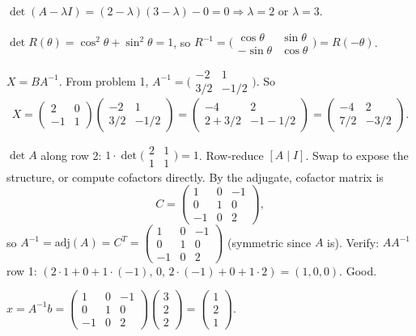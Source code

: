 \begin{solutions}
    \item $\det(A - \lambda I) = (2 - \lambda)(3 - \lambda) - 0 = 0 \Rightarrow \lambda = 2$ or $\lambda = 3$.
    \item $\det R(\theta) = \cos^{2}\theta + \sin^{2}\theta = 1$, so $R^{-1} = \bigl(\begin{smallmatrix} \cos \theta & \sin \theta \\ -\sin \theta & \cos \theta \end{smallmatrix}\bigr) = R(-\theta)$.
    \item $X = B A^{-1}$. From problem 1, $A^{-1} = \bigl(\begin{smallmatrix} -2 & 1 \\ 3/2 & -1/2 \end{smallmatrix}\bigr)$. So
    \[
    X = \begin{pmatrix} 2 & 0 \\ -1 & 1 \end{pmatrix} \begin{pmatrix} -2 & 1 \\ 3/2 & -1/2 \end{pmatrix} = \begin{pmatrix} -4 & 2 \\ 2 + 3/2 & -1 - 1/2 \end{pmatrix} = \begin{pmatrix} -4 & 2 \\ 7/2 & -3/2 \end{pmatrix}.
    \]
    \item $\det A$ along row 2: $1 \cdot \det\bigl(\begin{smallmatrix} 2 & 1 \\ 1 & 1 \end{smallmatrix}\bigr) = 1$. Row-reduce $[A \mid I]$. Swap to expose the structure, or compute cofactors directly. By the adjugate, cofactor matrix is
    \[
    C = \begin{pmatrix} 1 & 0 & -1 \\ 0 & 1 & 0 \\ -1 & 0 & 2 \end{pmatrix},
    \]
    so $A^{-1} = \mathrm{adj}(A) = C^{T} = \begin{pmatrix} 1 & 0 & -1 \\ 0 & 1 & 0 \\ -1 & 0 & 2 \end{pmatrix}$ (symmetric since $A$ is). Verify: $A A^{-1}$ row 1: $(2 \cdot 1 + 0 + 1 \cdot (-1),\, 0,\, 2 \cdot (-1) + 0 + 1 \cdot 2) = (1, 0, 0)$. Good.
    \item $x = A^{-1} b = \begin{pmatrix} 1 & 0 & -1 \\ 0 & 1 & 0 \\ -1 & 0 & 2 \end{pmatrix} \begin{pmatrix} 3 \\ 2 \\ 2 \end{pmatrix} = \begin{pmatrix} 1 \\ 2 \\ 1 \end{pmatrix}$.

\end{solutions}
